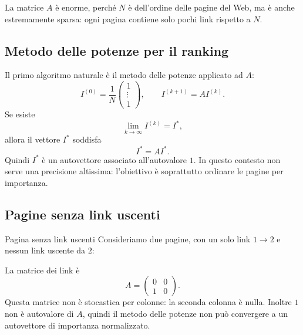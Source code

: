 \documentclass[a4paper]{article}
\begin{document}
La matrice \(A\) è enorme, perché \(N\) è dell'ordine delle pagine del Web, ma è anche estremamente sparsa: ogni pagina contiene solo pochi link rispetto a \(N\).

\subsection{Metodo delle potenze per il ranking}

Il primo algoritmo naturale è il metodo delle potenze applicato ad \(A\):
\[
    I^{(0)}=\frac1N
    \begin{pmatrix}
        1\\
        \vdots\\
        1
    \end{pmatrix},
    \qquad
    I^{(k+1)}=AI^{(k)}.
\]
Se esiste
\[
    \lim_{k\to\infty}I^{(k)}=I^*,
\]
allora il vettore \(I^*\) soddisfa
\[
    I^*=AI^*.
\]
Quindi \(I^*\) è un autovettore associato all'autovalore \(1\). In questo contesto non serve una precisione altissima: l'obiettivo è soprattutto ordinare le pagine per importanza.

\subsection{Pagine senza link uscenti}

\begin{snippetexample}{Pagina senza link uscenti}
    Consideriamo due pagine, con un solo link \(1\to 2\) e nessun link uscente da \(2\):

    \begin{center}
    \end{center}

    La matrice dei link è
    \[
        A=
        \begin{pmatrix}
            0&0\\
            1&0
        \end{pmatrix}.
    \]
    Questa matrice non è stocastica per colonne: la seconda colonna è nulla. Inoltre \(1\) non è autovalore di \(A\), quindi il metodo delle potenze non può convergere a un autovettore di importanza normalizzato.
\end{snippetexample}
\end{document}
